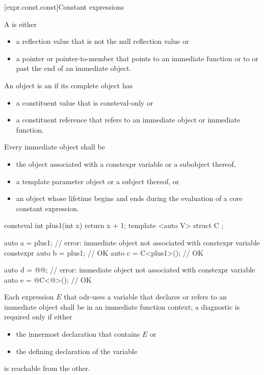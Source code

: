 [expr.const.const]{Constant expressions}

\pnum
A  is either
\begin{itemize}
\item
a reflection value
that is not the null reflection value or
\item
a pointer or pointer-to-member
that points to an immediate function
or to or past the end of an immediate object.
\end{itemize}

\pnum
An object is an 
if its complete object has
\begin{itemize}
\item
a constituent value that is consteval-only or
\item
a constituent reference that refers to
an immediate object or immediate function.
\end{itemize}

\pnum
Every immediate object shall be
\begin{itemize}
\item
the object associated with a constexpr variable
or a subobject thereof,
\item
a template parameter object
or a subject thereof, or
\item
an object whose lifetime begins and ends
during the evaluation of a core constant expression.
\end{itemize}
\begin{example}
\begin{codeblock}
consteval int plus1(int x) { return x + 1; }
template <auto V> struct C {};

auto a = plus1;                 // error: immediate object not associated with constexpr variable
constexpr auto b = plus1;       // OK
auto c = C<plus1>();            // OK

auto d = @@;                 // error: immediate object not associated with constexpr variable
auto e = @C<@>();           // OK
\end{codeblock}
\end{example}
Each expression $E$ that odr-uses a variable
that declares or refers to an immediate object
shall be in an immediate function context;
a diagnostic is required only if either
\begin{itemize}
\item
the innermost declaration that contains $E$ or
\item
the defining declaration of the variable
\end{itemize}
is reachable from the other.

